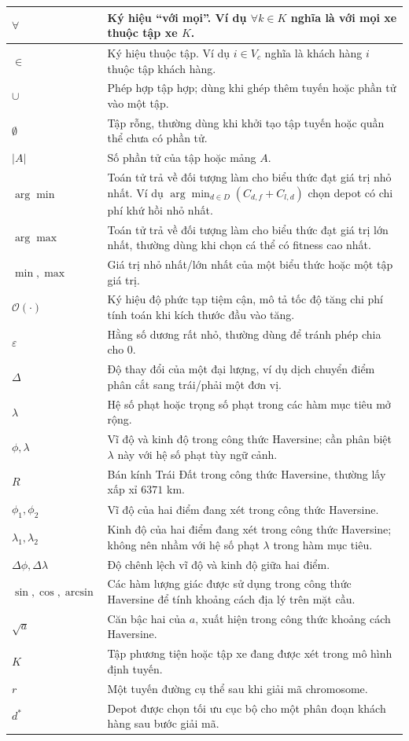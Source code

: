 \documentclass[12pt,a4paper]{article}
\numberwithin{figure}{subsection}
\numberwithin{table}{subsection}
\begin{document}
\begin{longtable}{|p{3.2cm}|p{10.8cm}|}
\hline
$\forall$ & Ký hiệu ``với mọi''. Ví dụ $\forall k \in K$ nghĩa là với mọi xe thuộc tập xe $K$. \\
\hline
$\in$ & Ký hiệu thuộc tập. Ví dụ $i \in V_c$ nghĩa là khách hàng $i$ thuộc tập khách hàng. \\
\hline
$\cup$ & Phép hợp tập hợp; dùng khi ghép thêm tuyến hoặc phần tử vào một tập. \\
\hline
$\emptyset$ & Tập rỗng, thường dùng khi khởi tạo tập tuyến hoặc quần thể chưa có phần tử. \\
\hline
$|A|$ & Số phần tử của tập hoặc mảng $A$. \\
\hline
$\arg\min$ & Toán tử trả về đối tượng làm cho biểu thức đạt giá trị nhỏ nhất. Ví dụ $\arg\min_{d \in D}(C_{d,f}+C_{l,d})$ chọn depot có chi phí khứ hồi nhỏ nhất. \\
\hline
$\arg\max$ & Toán tử trả về đối tượng làm cho biểu thức đạt giá trị lớn nhất, thường dùng khi chọn cá thể có fitness cao nhất. \\
\hline
$\min,\max$ & Giá trị nhỏ nhất/lớn nhất của một biểu thức hoặc một tập giá trị. \\
\hline
$\mathcal{O}(\cdot)$ & Ký hiệu độ phức tạp tiệm cận, mô tả tốc độ tăng chi phí tính toán khi kích thước đầu vào tăng. \\
\hline
$\varepsilon$ & Hằng số dương rất nhỏ, thường dùng để tránh phép chia cho 0. \\
\hline
$\Delta$ & Độ thay đổi của một đại lượng, ví dụ dịch chuyển điểm phân cắt sang trái/phải một đơn vị. \\
\hline
$\lambda$ & Hệ số phạt hoặc trọng số phạt trong các hàm mục tiêu mở rộng. \\
\hline
$\phi,\lambda$ & Vĩ độ và kinh độ trong công thức Haversine; cần phân biệt $\lambda$ này với hệ số phạt tùy ngữ cảnh. \\
\hline
$R$ & Bán kính Trái Đất trong công thức Haversine, thường lấy xấp xỉ $6371$ km. \\
\hline
$\phi_1,\phi_2$ & Vĩ độ của hai điểm đang xét trong công thức Haversine. \\
\hline
$\lambda_1,\lambda_2$ & Kinh độ của hai điểm đang xét trong công thức Haversine; không nên nhầm với hệ số phạt $\lambda$ trong hàm mục tiêu. \\
\hline
$\Delta\phi,\Delta\lambda$ & Độ chênh lệch vĩ độ và kinh độ giữa hai điểm. \\
\hline
$\sin,\cos,\arcsin$ & Các hàm lượng giác được sử dụng trong công thức Haversine để tính khoảng cách địa lý trên mặt cầu. \\
\hline
$\sqrt{a}$ & Căn bậc hai của $a$, xuất hiện trong công thức khoảng cách Haversine. \\
\hline
$K$ & Tập phương tiện hoặc tập xe đang được xét trong mô hình định tuyến. \\
\hline
$r$ & Một tuyến đường cụ thể sau khi giải mã chromosome. \\
\hline
$d^*$ & Depot được chọn tối ưu cục bộ cho một phân đoạn khách hàng sau bước giải mã. \\
\hline
\end{longtable}
\end{document}
